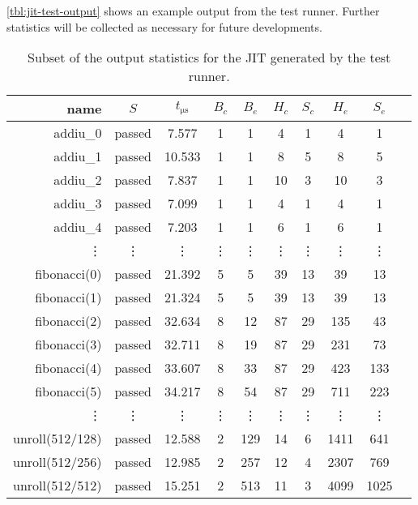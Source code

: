 \autoref{tbl:jit-test-output} shows an example output from the test runner. Further statistics will be collected as necessary for future developments.

\begin{table}[H] 
    \centering
    \begin{tabular}{r|ccccccccc}
        \toprule
        name & $S$ & $t_{\si{\micro\second}}$ & $B_c$ & $B_e$ & $H_c$ & $S_c$ & $H_e$ & $S_e$ \\
        \midrule

        addiu\_0 & passed & 7.577 & 1 & 1 & 4 & 1 & 4 & 1 \\
        addiu\_1 & passed & 10.533 & 1 & 1 & 8 & 5 & 8 & 5 \\
        addiu\_2 & passed & 7.837 & 1 & 1 & 10 & 3 & 10 & 3 \\
        addiu\_3 & passed & 7.099 & 1 & 1 & 4 & 1 & 4 & 1 \\
        addiu\_4 & passed & 7.203 & 1 & 1 & 6 & 1 & 6 & 1 \\

        \vdots & \vdots & \vdots & \vdots & \vdots & \vdots & \vdots & \vdots & \vdots \\

        fibonacci(0) & passed & 21.392 & 5 & 5 & 39 & 13 & 39 & 13 \\
        fibonacci(1) & passed & 21.324 & 5 & 5 & 39 & 13 & 39 & 13 \\
        fibonacci(2) & passed & 32.634 & 8 & 12 & 87 & 29 & 135 & 43 \\
        fibonacci(3) & passed & 32.711 & 8 & 19 & 87 & 29 & 231 & 73 \\
        fibonacci(4) & passed & 33.607 & 8 & 33 & 87 & 29 & 423 & 133 \\
        fibonacci(5) & passed & 34.217 & 8 & 54 & 87 & 29 & 711 & 223 \\

        \vdots & \vdots & \vdots & \vdots & \vdots & \vdots & \vdots & \vdots & \vdots \\

        unroll(512/128) & passed & 12.588 & 2 & 129 & 14 & 6 & 1411 & 641 \\
        unroll(512/256) & passed & 12.985 & 2 & 257 & 12 & 4 & 2307 & 769 \\
        unroll(512/512) & passed & 15.251 & 2 & 513 & 11 & 3 & 4099 & 1025 \\

        \bottomrule
    \end{tabular}
    \caption{Subset of the output statistics for the JIT generated by the test runner.}
    \label{tbl:jit-test-output}
\end{table}